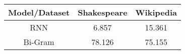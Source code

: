 \begin{center}
\begin{tabular}{||c c c||} 
    \hline
    Model/Dataset & Shakespeare & Wikipedia \\ [0.5ex] 
    \hline\hline
    RNN & 6.857 & 15.361 \\ 
    \hline
    Bi-Gram & 78.126 & 75.155 \\
    \hline
\end{tabular}
\end{center}